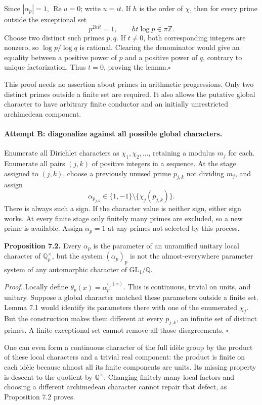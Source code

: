 \documentclass[11pt]{article}
\begin{document}
Since $|\alpha_p|=1$, $\operatorname{Re}u=0$; write $u=it$. If $h$ is
the order of $\chi$, then for every prime outside the exceptional set
\[
 p^{2hit}=1,\qquad ht\log p\in\pi\mathbb Z.
\]
Choose two distinct such primes $p,q$. If $t\ne0$, both corresponding
integers are nonzero, so $\log p/\log q$ is rational. Clearing the
denominator would give an equality between a positive power of $p$
and a positive power of $q$, contrary to unique factorization. Thus
$t=0$, proving the lemma.\hfill$\square$

This proof needs no assertion about primes in arithmetic progressions.
Only two distinct primes outside a finite set are required. It also
allows the putative global character to have arbitrary finite
conductor and an initially unrestricted archimedean component.

\paragraph{Attempt B: diagonalize against all possible global characters.}
Enumerate all Dirichlet characters as $\chi_1,\chi_2,\ldots$, retaining
a modulus $m_j$ for each. Enumerate all pairs $(j,k)$ of positive
integers in a sequence. At the stage assigned to $(j,k)$, choose a
previously unused prime $p_{j,k}$ not dividing $m_j$, and assign
\[
 \alpha_{p_{j,k}}\in\{1,-1\}\setminus\{\chi_j(p_{j,k})\}.
\]
There is always such a sign. If the character value is neither sign,
either sign works. At every finite stage only finitely many primes are
excluded, so a new prime is available. Assign $\alpha_p=1$ at any
primes not selected by this process.

\textbf{Proposition 7.2.} Every $\alpha_p$ is the parameter of an
unramified unitary local character of $\mathbb Q_p^\times$, but the
system $(\alpha_p)_p$ is not the almost-everywhere parameter system of
any automorphic character of $\mathrm{GL}_1/\mathbb Q$.

\emph{Proof.} Locally define
$\theta_p(x)=\alpha_p^{v_p(x)}$. This is continuous, trivial on units,
and unitary. Suppose a global character matched these parameters
outside a finite set. Lemma 7.1 would identify its parameters there
with one of the enumerated $\chi_j$. But the construction makes them
different at every $p_{j,k}$, an infinite set of distinct primes. A
finite exceptional set cannot remove all those disagreements.
\hfill$\square$

One can even form a continuous character of the full id\`ele group by
the product of these local characters and a trivial real component:
the product is finite on each id\`ele because almost all its finite
components are units. Its missing property is descent to the quotient
by $\mathbb Q^\times$. Changing finitely many local factors and
choosing a different archimedean character cannot repair that defect,
as Proposition 7.2 proves.
\end{document}
